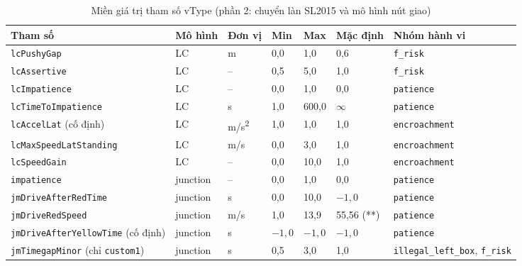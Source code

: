\documentclass[../DoAn.tex]{subfiles}
\begin{document}
\begin{table}[H]
\centering
\small\setlength{\tabcolsep}{3pt}
\begin{tabular}{|p{3.0cm}|p{1.6cm}|p{1.2cm}|p{1.1cm}|p{1.1cm}|p{1.6cm}|p{3.2cm}|}
\hline
\textbf{Tham số} & \textbf{Mô hình} & \textbf{Đơn vị} & \textbf{Min} & \textbf{Max} & \textbf{Mặc định} & \textbf{Nhóm hành vi} \\ \hline
\texttt{lcPushyGap} & LC & m & 0,0 & 1,0 & 0,6 & \texttt{f\_\allowbreak risk} \\ \hline
\texttt{lcAssertive} & LC & -- & 0,5 & 5,0 & 1,0 & \texttt{f\_\allowbreak risk} \\ \hline
\texttt{lcImpatience} & LC & -- & 0,0 & 1,0 & 0,0 & \texttt{patience} \\ \hline
\texttt{lcTimeTo\allowbreak Impatience} & LC & s & 1,0 & 600,0 & $\infty$ & \texttt{patience} \\ \hline
\texttt{lcAccelLat} (cố định) & LC & m/s\textsuperscript{2} & 1,0 & 1,0 & 1,0 & \texttt{encroachment} \\ \hline
\texttt{lcMaxSpeed\allowbreak LatStanding} & LC & m/s & 0,0 & 3,0 & 1,0 & \texttt{encroachment} \\ \hline
\texttt{lcSpeedGain} & LC & -- & 0,0 & 10,0 & 1,0 & \texttt{encroachment} \\ \hline
\texttt{impatience} & junction & -- & 0,0 & 1,0 & 0,0 & \texttt{patience} \\ \hline
\texttt{jmDriveAfter\allowbreak RedTime} & junction & s & 0,0 & 10,0 & $-1{,}0$ & \texttt{patience} \\ \hline
\texttt{jmDriveRed\allowbreak Speed} & junction & m/s & 1,0 & 13,9 & 55,56 (**) & \texttt{patience} \\ \hline
\texttt{jmDriveAfter\allowbreak YellowTime} (cố định) & junction & s & $-1{,}0$ & $-1{,}0$ & $-1{,}0$ & \texttt{patience} \\ \hline
\texttt{jmTimegap\allowbreak Minor} (chỉ \texttt{custom1}) & junction & s & 0,5 & 3,0 & 1,0 & \texttt{illegal\_\allowbreak left\_\allowbreak box}, \texttt{f\_\allowbreak risk} \\ \hline
\end{tabular}
\caption{Miền giá trị tham số vType (phần 2: chuyển làn SL2015 và mô hình nút giao)}
\label{table:appendix_bounds_2}
\end{table}
\end{document}
